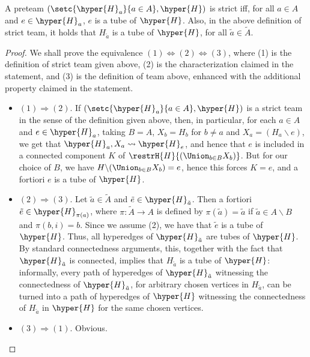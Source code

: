 \begin{lemma} \label{Jovana-lemma} 
A preteam $(\setc{\hyper{H}_a}{a\in A},\hyper{H})$ is strict iff, for all $a \in A$ and $e\in\hyper{H}_a$,  $e$ is a tube of $\hyper{H}$. Also, in the above definition of strict team, it holds that $H_{\tilde{a}}$ is a tube of $\hyper{H}$, for all $\tilde{a}\in\tilde{A}$.
\end{lemma}
\begin{proof}  We shall prove the equivalence $(1)\Leftrightarrow (2)\Leftrightarrow (3)$, where (1) is the definition of strict team given above, (2) is the characterization claimed in the statement, and (3) is the definition of team above, enhanced with the additional property claimed in the statement.
\begin{itemize}
\item $(1)\Rightarrow (2)$. If $(\setc{\hyper{H}_a}{a\in A},\hyper{H})$ is a strict team in the sense of the definition given above, then, in particular, for each $a \in A$ and $e\in\hyper{H}_a$, taking $B=A$, $X_b=H_b$ for $b\neq a$ and $X_a=(H_a\backslash e)$, we get that $\hyper{H}_a,X_a\leadsto \hyper{H}_e$, and hence that $e$ is included in a connected component $K$ of $\restrH{H}{(\Union_{b\in B}X_b)}$. But for our choice of $B$, we have
$H\backslash(\Union_{b\in B}X_b)=e$, hence this forces $K=e$, and a fortiori $e$ is a tube of  $\hyper{H}$. 

\item $(2)\Rightarrow (3)$. Let $\tilde{a}\in\tilde{A}$ and $\tilde{e}\in \hyper{H}_{\tilde{a}}$. Then a fortiori $\tilde{e}\in \hyper{H}_{\pi(a)}$, where $\pi:\tilde{A}\rightarrow A$ is defined by $\pi(\tilde{a})=\tilde{a}$ if $\tilde{a}\in  A\backslash B$ and $\pi{(b,i)}=b$. Since we assume (2), we have that $\tilde{e}$ is a tube of $\hyper{H}$.  Thus, all hyperedges of $\hyper{H}_{\tilde{a}}$ are tubes of $\hyper{H}$. By standard connectedness arguments, this, together with the fact that $\hyper{H}_{\tilde{a}}$ is connected, 
implies that $H_{\tilde{a}}$ is a tube of  $\hyper{H}$: informally, every path of hyperedges of $\hyper{H}_{\tilde{a}}$ witnessing the connectedness of $\hyper{H}_{\tilde{a}}$, for arbitrary chosen vertices in  $H_{\tilde{a}}$, can be turned into a path of  hyperedges of $\hyper{H}$ witnessing the connectedness of $H_{\tilde{a}}$ in $\hyper{H}$ for the same chosen vertices.

\item $(3)\Rightarrow (1)$. Obvious.
\end{itemize}
\end{proof}

